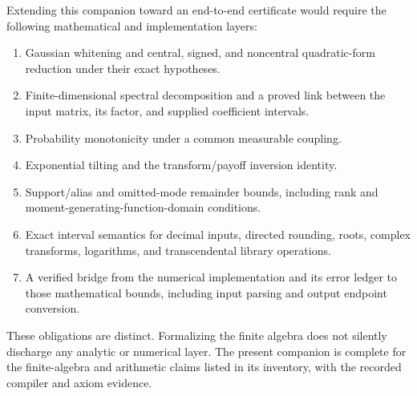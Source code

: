 \documentclass[11pt]{article}
\begin{document}
Extending this companion toward an end-to-end certificate would require the
following mathematical and implementation layers:
\begin{enumerate}[nosep,topsep=4pt]
 \item Gaussian whitening and central, signed, and noncentral quadratic-form
 reduction under their exact hypotheses.
 \item Finite-dimensional spectral decomposition and a proved link between
 the input matrix, its factor, and supplied coefficient intervals.
 \item Probability monotonicity under a common measurable coupling.
 \item Exponential tilting and the transform/payoff inversion identity.
 \item Support/alias and omitted-mode remainder bounds, including rank and
 moment-generating-function-domain conditions.
 \item Exact interval semantics for decimal inputs, directed rounding, roots,
 complex transforms, logarithms, and transcendental library operations.
 \item A verified bridge from the numerical implementation and its error
 ledger to those mathematical bounds, including input parsing and output
 endpoint conversion.
\end{enumerate}
These obligations are distinct. Formalizing the finite algebra does not
silently discharge any analytic or numerical layer. The present companion
is complete for the finite-algebra and arithmetic claims listed in its
inventory, with the recorded compiler and axiom evidence.

\endgroup
\end{document}
